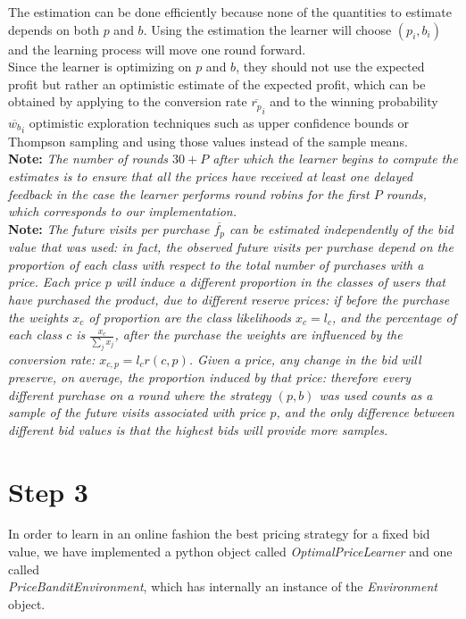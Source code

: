 \documentclass[11pt]{article} %
\begin{document}
The estimation can be done efficiently because none of the quantities to estimate depends on both $p$ and $b$. Using the estimation the learner will choose $(p_i,b_i)$ and the learning process will move one round forward.\\
Since the learner is optimizing on $p$ and $b$, they should not use the expected profit but rather an optimistic estimate of the expected profit, which can be obtained by applying to the conversion rate $\overline{r_p}_i$ and to the winning probability $\overline{w_b}_i$ optimistic exploration techniques such as upper confidence bounds or Thompson sampling and using those values instead of the sample means.\\

\textbf{Note:} \textit{The number of rounds $30+P$ after which the learner begins to compute the estimates is to ensure that all the prices have received at least one delayed feedback in the case the learner performs round robins for the first $P$ rounds, which corresponds to our implementation.}\\

\textbf{Note:} \textit{The future visits per purchase $\overline{f_p}$ can be estimated independently of the bid value that was used: in fact, the observed future visits per purchase depend on the proportion of each class with respect to the total number of purchases with a price. Each price $p$ will induce a different proportion in the classes of users that have purchased the product, due to different reserve prices: if before the purchase the weights $x_c$ of proportion are the class likelihoods $x_c=l_c$, and the percentage of each class $c$ is $\frac{x_c}{\sum_j{x_j}}$, after the purchase the weights are influenced by the conversion rate: $x_{c,p}=l_cr(c,p)$. Given a price, any change in the bid will preserve, on average, the proportion induced by that price: therefore every different purchase on a round where the strategy $(p,b)$ was used counts as a sample of the future visits associated with price $p$, and the only difference between different bid values is that the highest bids will provide more samples.}

\clearpage
\section{Step 3}
In order to learn in an online fashion the best pricing strategy for a fixed bid value, we have implemented a python object called \textit{OptimalPriceLearner} and one called\\ \textit{PriceBanditEnvironment}, which has internally an instance of the \textit{Environment} object. 
\end{document}
